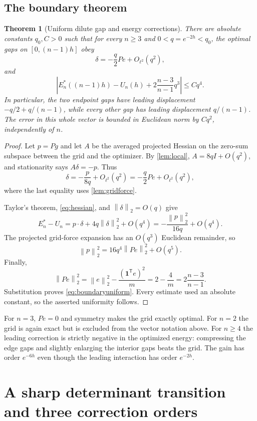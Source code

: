 \documentclass[11pt,a4paper]{article}
\newtheorem{theorem}{Theorem}[section]
\theoremstyle{definition}
\theoremstyle{remark}
\newcommand{\ones}{\mathbf 1}
\newcommand{\norm}[1]{\left\lVert#1\right\rVert}
\begin{document}
\subsection{The boundary theorem}
\begin{theorem}[Uniform dilute gap and energy corrections]
\label{thm:boundary}
There are absolute constants $q_0,C>0$ such that for every $n\ge3$ and
$0<q=e^{-2h}<q_0$, the optimal gaps on $[0,(n-1)h]$ obey
\begin{equation}
 \delta=-\frac q2Pe+O_{\ell^2}(q^2),
 \label{eq:deltaleading}
\end{equation}
and
\begin{equation}
 \left|E_n^*((n-1)h)-U_n(h)
       +2\frac{n-3}{n-1}q^3\right|\le Cq^4.
 \label{eq:boundaryuniform}
\end{equation}
In particular, the two endpoint gaps have leading displacement
$-q/2+q/(n-1)$, while every other gap has leading displacement
$q/(n-1)$. The error in this whole vector is bounded in Euclidean norm
by $Cq^2$, independently of $n$.
\end{theorem}
\begin{proof}
Let $p=Pg$ and let $A$ be the averaged projected Hessian on the zero-sum
subspace between the grid and the optimizer. By \cref{lem:local},
$A=8qI+O(q^2)$, and stationarity says $A\delta=-p$. Thus
\[
 \delta=-\frac{p}{8q}+O_{\ell^2}(q^2)
        =-\frac q2Pe+O_{\ell^2}(q^2),
\]
where the last equality uses \cref{lem:gridforce}.

Taylor's theorem, \eqref{eq:hessian}, and $\norm\delta_2=O(q)$ give
\[
 E_n^*-U_n=p\cdot\delta+4q\norm\delta_2^2+O(q^4)
          =-\frac{\norm p_2^2}{16q}+O(q^4).
\]
The projected grid-force expansion has an $O(q^3)$ Euclidean remainder,
so
\[
 \norm p_2^2=16q^4\norm{Pe}_2^2+O(q^5).
\]
Finally,
\[
 \norm{Pe}_2^2=\norm e_2^2-\frac{(\ones^{\mathsf T}e)^2}{m}
 =2-\frac4m=2\frac{n-3}{n-1}.
\]
Substitution proves \eqref{eq:boundaryuniform}. Every estimate used an
absolute constant, so the asserted uniformity follows.
\end{proof}

For $n=3$, $Pe=0$ and symmetry makes the grid exactly optimal. For $n=2$
the grid is again exact but is excluded from the vector notation above.
For $n\ge4$ the leading correction is strictly negative in the optimized
energy: compressing the edge gaps and slightly enlarging the interior gaps
beats the grid. The gain has order $e^{-6h}$ even though the leading
interaction has order $e^{-2h}$.

\section{A sharp determinant transition and three correction orders}
\label{sec:transition}
\end{document}
